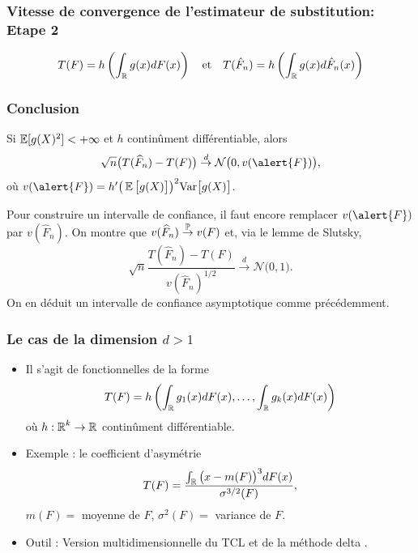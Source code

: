 \begin{frame}
\frametitle{Vitesse de convergence de l'estimateur de substitution: Etape 2}
\[
T(F)= h \left( \int_{\mathbb{R}} g(x) dF(x) \right) \quad \text{et} \quad T(\hat{F}_n)= h \left( \int_{\mathbb{R}} g(x) d \hat{F}_n(x) \right)
\]
\end{frame}


\begin{frame}
\frametitle{Conclusion}
\begin{prop}
Si $\operatorname{{\mathbb E}}[g(X)^2]<+\infty$ et $h$ continûment différentiable, alors
$$\sqrt{n}\big(T(\widehat F_n)-T(F)\big)\stackrel{d}{\rightarrow} \gauss\big(0,v(\alert{F})\big),
$$
où $v(\alert{F}) = h'\big(\E\big[g(X)\big]\big)^2\mathrm{Var}\big[g(X)\big]$.
\end{prop}
Pour construire un \alert{intervalle de confiance}, il faut encore remplacer $v(\alert{F})$ par $v(\widehat F_n)$.
\alert{On montre que} $v(\widehat F_n)\stackrel{\operatorname{{\mathbb P}}}{\rightarrow} v(F)$ et, via le lemme de Slutsky,
$$
\sqrt{n}\frac{T(\widehat F_n)-T(F)}{v(\widehat F_n)^{1/2}}\stackrel{d}{\rightarrow} {\mathcal N}\big(0,1\big).
$$
On \alert{en déduit} un intervalle de confiance asymptotique comme précédemment.
\end{frame}
\begin{frame}
\frametitle{Le cas de la dimension $d>1$}
\begin{itemize}
\item Il s'agit de fonctionnelles de la forme
$$T(F) = h\left(\int_{\operatorname{{\mathbb R}}}g_1(x)dF(x),\ldots, \int_{\operatorname{{\mathbb R}}}g_k(x)dF(x)\right)$$
où $h:\operatorname{{\mathbb R}}^k\rightarrow \operatorname{{\mathbb R}}$ continûment différentiable.
\item \alert{Exemple} : le coefficient d'asymétrie
$$T(F) = \frac{\int_{\operatorname{{\mathbb R}}}\big(x-m(F)\big)^3dF(x)}{\sigma^{3/2}(F)},$$
$m(F)=$ moyenne de $F$, $\sigma^2(F) =$ variance de $F$.
\item \alert{Outil :} Version multidimensionnelle du TCL et de la \og méthode delta \fg{}.
\end{itemize}
\end{frame}

